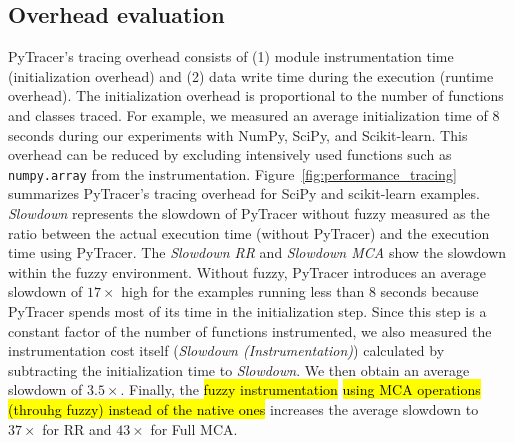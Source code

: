 \documentclass[10pt,journal,compsoc]{IEEEtran}
\newcommand{\pytracer}[0]{PyTracer\xspace}
\DeclareRobustCommand{\add}[1]{{\sethlcolor{lightgreen}\hl{#1}}}
\DeclareRobustCommand{\remove}[1]{{\sethlcolor{lightred}\hl{#1}}}
\begin{document}
\subsection{Overhead evaluation}

\pytracer's tracing overhead consists of (1) module instrumentation time
(initialization overhead) and (2) data write time during the execution (runtime
overhead). The initialization overhead is proportional to the number of
functions and classes traced. For example, we measured an average initialization
time of 8 seconds during our experiments with  NumPy, SciPy, and Scikit-learn.
This overhead can be reduced by excluding intensively used functions such as
\texttt{numpy.array} from the instrumentation.
Figure~\ref{fig:performance_tracing} summarizes \pytracer's tracing overhead for
SciPy and scikit-learn examples. \textit{Slowdown} represents the slowdown of
\pytracer without fuzzy measured as the ratio between the actual execution time
(without \pytracer) and the execution time using \pytracer. The \textit{Slowdown
    RR} and \textit{Slowdown MCA} show the slowdown within the fuzzy environment.
Without fuzzy, \pytracer introduces an average slowdown of $17\times$ high for
the examples running less than 8 seconds because \pytracer spends most of its
time in the initialization step. Since this step is a constant factor of the
number of functions instrumented, we also measured the instrumentation cost
itself (\textit{Slowdown (Instrumentation)}) calculated by subtracting the
initialization time to \textit{Slowdown}. We then obtain an average slowdown of
$3.5\times$. Finally, the \remove{fuzzy instrumentation} \add{using MCA operations (throuhg fuzzy) instead of the native ones} increases the average slowdown
to $37\times$ for RR and $43\times$ for Full MCA.

\end{document}
